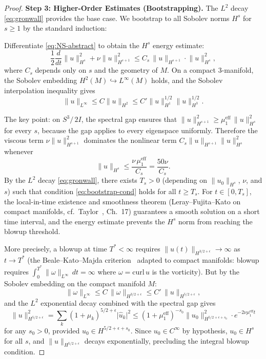 \documentclass[11pt,a4paper]{article}
\theoremstyle{plain}
\theoremstyle{definition}
\newcommand{\DS}{S^3\!/\,2I}             %
\newcommand{\norm}[1]{\lVert #1 \rVert}
\newcommand{\abs}[1]{\lvert #1 \rvert}
\begin{document}
\begin{proof}
\medskip
\noindent\textbf{Step 3: Higher-Order Estimates (Bootstrapping).}
The $L^2$ decay \eqref{eq:gronwall} provides the base case.  We bootstrap to
all Sobolev norms $H^s$ for $s \ge 1$ by the standard induction:

Differentiate \eqref{eq:NS-abstract} to obtain the $H^s$ energy estimate:
\[
  \frac{1}{2}\frac{d}{dt}\norm{u}_{H^s}^2
  + \nu \norm{u}_{H^{s+1}}^2
  \le C_s\, \norm{u}_{H^{s+1}} \cdot \norm{u}_{H^s}^2,
\]
where $C_s$ depends only on $s$ and the geometry of $M$.  On a compact
$3$-manifold, the Sobolev embedding $H^2(M) \hookrightarrow L^\infty(M)$
holds, and the Sobolev interpolation inequality gives
\[
  \norm{u}_{L^\infty} \le C \norm{u}_{H^2}
  \le C' \norm{u}_{H^1}^{1/2} \norm{u}_{H^3}^{1/2}.
\]

The key point: on $\DS$, the spectral gap ensures that $\norm{u}_{H^{s+1}}^2
\ge \mu_1^{\text{eff}}\, \norm{u}_{H^s}^2$ for every $s$, because the
gap applies to every eigenspace uniformly.  Therefore the viscous term
$\nu\norm{u}_{H^{s+1}}^2$ dominates the nonlinear term
$C_s \norm{u}_{H^{s+1}} \norm{u}_{H^s}^2$ whenever
\begin{equation}\label{eq:bootstrap-cond}
  \norm{u}_{H^s} \le \frac{\nu\, \mu_1^{\text{eff}}}{C_s}
  = \frac{50\nu}{C_s}.
\end{equation}
By the $L^2$ decay \eqref{eq:gronwall}, there exists $T_s > 0$ (depending
on $\norm{u_0}_{H^s}$, $\nu$, and $s$) such that condition
\eqref{eq:bootstrap-cond} holds for all $t \ge T_s$.  For $t \in [0, T_s]$,
the local-in-time existence and smoothness theorem (Leray--Fujita--Kato on
compact manifolds, cf.\ Taylor~\cite{Taylor}, Ch.~17) guarantees a smooth solution
on a short time interval, and the energy estimate prevents the $H^s$ norm
from reaching the blowup threshold.

More precisely, a blowup at time $T^* < \infty$ requires
$\norm{u(t)}_{H^{3/2+\epsilon}} \to \infty$ as $t \to T^*$ (the
Beale--Kato--Majda criterion~\cite{BKM} adapted to compact manifolds: blowup requires
$\int_0^{T^*} \norm{\omega}_{L^\infty}\, dt = \infty$ where $\omega =
\mathrm{curl}\, u$ is the vorticity).  But by the Sobolev embedding on
the compact manifold $M$:
\[
  \norm{\omega}_{L^\infty}
  \le C\, \norm{\omega}_{H^{3/2+\epsilon}}
  \le C'\, \norm{u}_{H^{5/2+\epsilon}},
\]
and the $L^2$ exponential decay combined with the spectral gap gives
\[
  \norm{u}_{H^{5/2+\epsilon}}^2
  = \sum_k (1+\mu_k)^{5/2+\epsilon} \abs{\hat u_k}^2
  \le (1+\mu_1^{\text{eff}})^{-s_0} \norm{u_0}_{H^{5/2+\epsilon+s_0}}^2
     \cdot e^{-2\nu\mu_1^{\text{eff}} t}
\]
for any $s_0 > 0$, provided $u_0 \in H^{5/2+\epsilon+s_0}$.  Since
$u_0 \in C^\infty$ by hypothesis, $u_0 \in H^s$ for all $s$, and
$\norm{u}_{H^{5/2+\epsilon}}$ decays exponentially, precluding the
integral blowup condition.


\end{proof}
\end{document}
